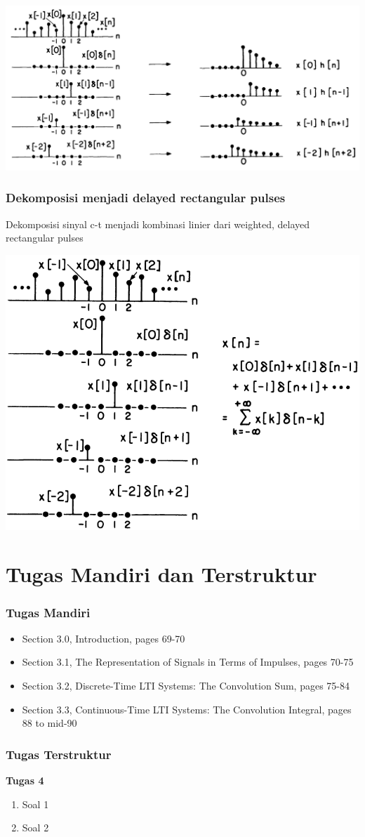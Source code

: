 \documentclass[pdflatex,compress,mathserif]{beamer}
\begin{document}
\begin{frame}
	\begin{center}
		\includegraphics[width=\linewidth]{img/img02}
	\end{center}
\end{frame}

\begin{frame}
	\frametitle{Dekomposisi menjadi delayed rectangular pulses}
	Dekomposisi sinyal c-t menjadi kombinasi linier dari weighted, delayed rectangular pulses
	\begin{center}
		\includegraphics[width=0.7\linewidth]{img/img01}
	\end{center}
\end{frame}

\section{Tugas Mandiri dan Terstruktur}

\begin{frame}
	\frametitle{Tugas Mandiri}
	\begin{itemize}
		\item Section 3.0, Introduction, pages 69-70
		\item Section 3.1, The Representation of Signals in Terms of Impulses, pages 70-75
		\item Section 3.2, Discrete-Time LTI Systems: The Convolution Sum, pages 75-84
		\item Section 3.3, Continuous-Time LTI Systems: The Convolution Integral, pages 88 to mid-90
	\end{itemize}
\end{frame}

\begin{frame}
	\frametitle{Tugas Terstruktur}
	\textbf{Tugas 4}
	\begin{enumerate}
		\item Soal 1 
		\item Soal 2
	\end{enumerate}
\end{frame}
\end{document}
